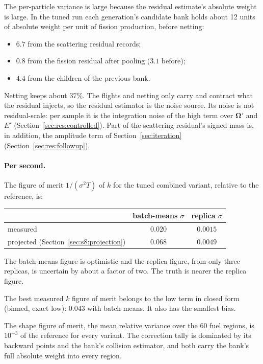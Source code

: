 The per-particle variance is large because the residual estimate's absolute weight is large. In
the tuned run each generation's candidate bank holds about 12 units of absolute weight per unit of
fission production, before netting:
\begin{itemize}
\item $6.7$ from the scattering residual records;
\item $0.8$ from the fission residual after pooling ($3.1$ before);
\item $4.4$ from the children of the previous bank.
\end{itemize}
Netting keeps about $37\%$. The flights and netting only carry and contract what the residual
injects, so the residual estimator is the noise source. Its noise is not residual-scale: per sample
it is the integration noise of the high term over $\mathbf\Omega'$ and $E'$
(Section~\ref{sec:res:controlled}). Part of the scattering residual's signed mass is, in addition,
the amplitude term of Section~\ref{sec:iteration} (Section~\ref{sec:res:followup}).

\paragraph{Per second.} The figure of merit $1/(\sigma^2T)$ of $k$ for the tuned combined variant,
relative to the reference, is:
\begin{center}
\begin{tabular}{@{}lcc@{}}
\toprule
 & batch-means $\sigma$ & replica $\sigma$\\
\midrule
measured & $0.020$ & $0.0015$\\
projected (Section~\ref{sec:s8:projection}) & $0.068$ & $0.0049$\\
\bottomrule
\end{tabular}
\end{center}
The batch-means figure is optimistic and the replica figure, from only three replicas, is uncertain
by about a factor of two. The truth is nearer the replica figure.

The best measured $k$ figure of merit belongs to the low term in closed form (binned, exact low):
$0.043$ with batch means. It also has the smallest bias.

The shape figure of merit, the mean relative variance over the 60 fuel regions, is $10^{-3}$ of the
reference for every variant. The correction tally is dominated by its backward points and the bank's
collision estimator, and both carry the bank's full absolute weight into every region.

